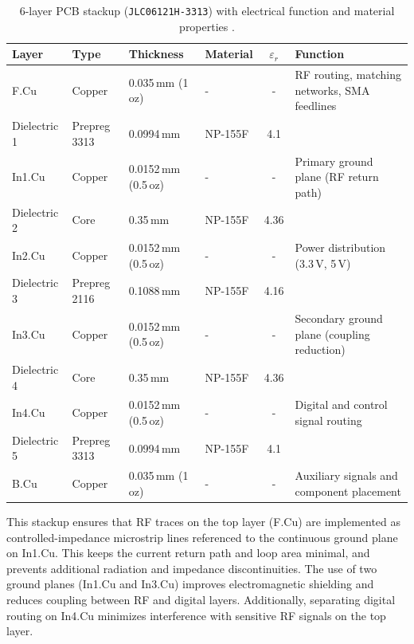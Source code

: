 \begin{table}[H]
    \centering
    \caption{6-layer PCB stackup (\texttt{JLC06121H-3313}) with electrical function and material properties \cite{jlcpcb_stackup}.}
    \small
    \renewcommand{\arraystretch}{1.2}
    \begin{tabularx}{\textwidth}{l l l l c X}
        \toprule
        \textbf{Layer} & \textbf{Type} & \textbf{Thickness} & \textbf{Material} & \textbf{$\varepsilon_r$} & \textbf{Function} \\
        \midrule
        F.Cu   & Copper       & 0.035\,mm (1\,oz)   & -       & -    & RF routing, matching networks, SMA feedlines \\
        Dielectric 1 & Prepreg 3313 & 0.0994\,mm & NP-155F & 4.1  &  \\
        In1.Cu & Copper       & 0.0152\,mm (0.5\,oz)& -       & -    & Primary ground plane (RF return path) \\
        Dielectric 2 & Core   & 0.35\,mm            & NP-155F & 4.36 &  \\
        In2.Cu & Copper       & 0.0152\,mm (0.5\,oz)& -       & -    & Power distribution (3.3\,V, 5\,V) \\
        Dielectric 3 & Prepreg 2116 & 0.1088\,mm & NP-155F & 4.16 &  \\
        In3.Cu & Copper       & 0.0152\,mm (0.5\,oz)& -       & -    & Secondary ground plane (coupling reduction) \\
        Dielectric 4 & Core   & 0.35\,mm            & NP-155F & 4.36 &  \\
        In4.Cu & Copper       & 0.0152\,mm (0.5\,oz)& -       & -    & Digital and control signal routing \\
        Dielectric 5 & Prepreg 3313 & 0.0994\,mm & NP-155F & 4.1  &  \\
        B.Cu   & Copper       & 0.035\,mm (1\,oz)   & -       & -    & Auxiliary signals and component placement \\
        \bottomrule
    \end{tabularx}
\end{table}

This stackup ensures that RF traces on the top layer (F.Cu) are implemented as controlled-impedance microstrip lines referenced to the continuous ground plane on In1.Cu. This keeps the current return path and loop area minimal, and prevents additional radiation and impedance discontinuities.
The use of two ground planes (In1.Cu and In3.Cu) improves electromagnetic shielding and reduces coupling between RF and digital layers. Additionally, separating digital routing on In4.Cu minimizes interference with sensitive RF signals on the top layer.

